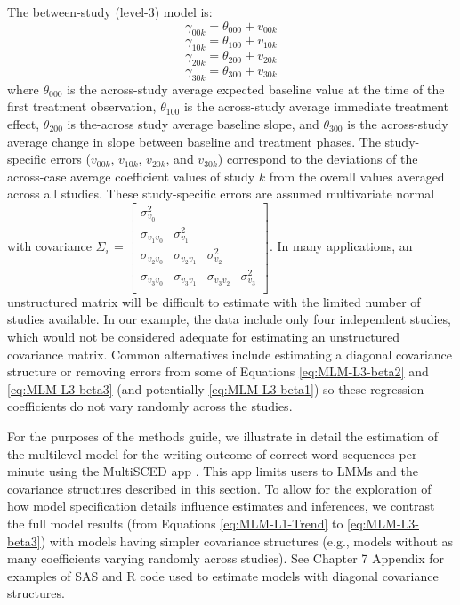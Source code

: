 \documentclass[
]{book}
\begin{document}
The between-study (level-3) model is:
\begin{equation}
\label{eq:MLM-L3-beta0}
\gamma_{00k} = \theta_{000} + v_{00k}
\end{equation}
\begin{equation}
\label{eq:MLM-L3-beta1}
\gamma_{10k} = \theta_{100} + v_{10k}
\end{equation}
\begin{equation}
\label{eq:MLM-L3-beta2}
\gamma_{20k} = \theta_{200} + v_{20k}
\end{equation}
\begin{equation}
\label{eq:MLM-L3-beta3}
\gamma_{30k} = \theta_{300} + v_{30k}
\end{equation}
where \(\theta_{000}\) is the across-study average expected baseline value at the time of the first treatment observation, \(\theta_{100}\) is the across-study average immediate treatment effect, \(\theta_{200}\) is the-across study average baseline slope, and \(\theta_{300}\) is the across-study average change in slope between baseline and treatment phases. The study-specific errors (\(v_{00k}\), \(v_{10k}\), \(v_{20k}\), and \(v_{30k}\)) correspond to the deviations of the across-case average coefficient values of study \(k\) from the overall values averaged across all studies. These study-specific errors are assumed multivariate normal with covariance
\(\Sigma_v = \begin{bmatrix} \sigma_{v_0}^2 & & & \\ \sigma_{v_1v_0} & \sigma_{v_1}^2 & & \\ \sigma_{v_2v_0} & \sigma_{v_2v_1} & \sigma_{v_2}^2 & \\ \sigma_{v_3v_0} & \sigma_{v_3v_1} & \sigma_{v_3v_2} & \sigma_{v_3}^2\\ \end{bmatrix}\). In many applications, an unstructured matrix will be difficult to estimate with the limited number of studies available. In our example, the data include only four independent studies, which would not be considered adequate for estimating an unstructured covariance matrix. Common alternatives include estimating a diagonal covariance structure or removing errors from some of Equations \eqref{eq:MLM-L3-beta2} and \eqref{eq:MLM-L3-beta3} (and potentially \eqref{eq:MLM-L3-beta1}) so these regression coefficients do not vary randomly across the studies.

For the purposes of the methods guide, we illustrate in detail the estimation of the multilevel model for the writing outcome of correct word sequences per minute using the MultiSCED app \citep{Declercq2020}. This app limits users to LMMs and the covariance structures described in this section. To allow for the exploration of how model specification details influence estimates and inferences, we contrast the full model results (from Equations \eqref{eq:MLM-L1-Trend} to \eqref{eq:MLM-L3-beta3}) with models having simpler covariance structures (e.g., models without as many coefficients varying randomly across studies). See Chapter 7 Appendix for examples of SAS and R code used to estimate models with diagonal covariance structures.
\end{document}
